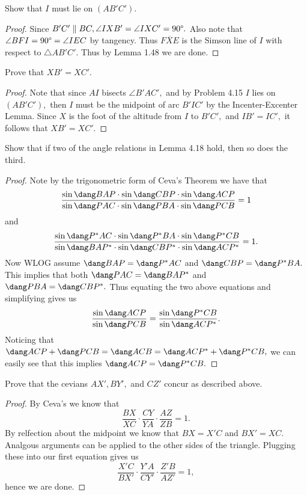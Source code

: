 \documentclass[letterpaper,oneside]{scrartcl}
\providecommand{\ol}{\overline}
\begin{document}
\begin{problem*}
  [4.15]
  Show that $I$ must lie on $(AB'C').$
\end{problem*}
\begin{proof}
  Since $B'C' \parallel BC, \angle IXB' = \angle IXC' = 90\degree.$ Also note that $\angle BFI = 90\degree = \angle IEC$ by tangency. Thus $\ol{FXE}$ is the Simson line of $I$ with respect to $\triangle AB'C'.$ Thus by Lemma 1.48 we are done. 
\end{proof}

\begin{problem*}
  [4.16]
  Prove that $XB'=XC'.$
\end{problem*}
\begin{proof}
  Note that since $AI$ bisects $\angle B'AC',$ and by Problem 4.15 $I$ lies on $(AB'C'),$ then $I$ must be the midpoint of arc $B'IC'$ by the Incenter-Excenter Lemma. Since $X$ is the foot of the altitude from $I$ to $B'C',$ and $IB'=IC',$ it follows that $XB' = XC'.$ 
\end{proof}

\begin{problem*}
  [4.19]
  Show that if two of the angle relations in Lemma 4.18 hold, then so does the third.
\end{problem*}
\begin{proof}
  Note by the trigonometric form of Ceva's Theorem we have that 
  $$\frac{\sin\dang BAP \cdot \sin\dang CBP \cdot \sin\dang ACP}{\sin\dang PAC \cdot \sin\dang PBA \cdot \sin\dang PCB} = 1$$ and
  $$\frac{\sin\dang P^*AC \cdot \sin\dang P^*BA \cdot \sin\dang P^*CB}{\sin\dang BAP^* \cdot \sin\dang CBP^* \cdot \sin\dang ACP^*} = 1.$$
  Now WLOG assume $\dang BAP = \dang P^*AC$ and $\dang CBP = \dang P^*BA.$ This implies that both $\dang PAC = \dang BAP^*$ and $\dang PBA = \dang CBP^*.$ Thus equating the two above equations and simplifying gives us
  $$\frac{\sin\dang ACP}{\sin\dang PCB} = \frac{\sin \dang P^*CB}{\sin\dang ACP^*}.$$ Noticing that $\dang ACP + \dang PCB = \dang ACB = \dang ACP^*+\dang P^*CB,$ we can easily see that this implies $\dang ACP = \dang P^*CB.$
\end{proof}

\begin{problem*}
  [4.20]
  Prove that the cevians $AX', BY',$ and $CZ'$ concur as described above. 
\end{problem*}
\begin{proof}
  By Ceva's we know that
  $$\frac{BX}{XC}\cdot\frac{CY}{YA}\cdot\frac{AZ}{ZB}=1.$$
  By relfection about the midpoint we know that $BX = X'C$ and $BX' = XC.$ Analgous arguments can be applied to the other sides of the triangle. Plugging these into our first equation gives us
  $$\frac{X'C}{BX'}\cdot\frac{Y'A}{CY'}\cdot\frac{Z'B}{AZ'}=1,$$ hence we are done.
\end{proof}
\end{document}
